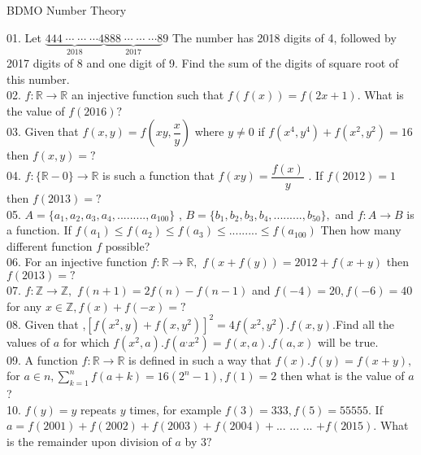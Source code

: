 \documentclass[a4paper,11pt]{article}
\begin{document}
\begin{center}
\begin{LARGE}
BDMO Number Theory\\
\end{LARGE}
\end{center}

01. Let $\underbrace{444\;\cdots\; \cdots\; \cdots 4}_{2018}\underbrace{888\;\cdots\; \cdots\; \cdots 8}_{2017}9$ The number has 2018 digits of 4, followed by 2017 digits of 8 and one digit of 9. Find the sum of the digits of square root of this number.\\

02. $f:\mathbb{R}\rightarrow \mathbb{R}$ an injective function such that $f(f(x))=f(2x+1)$. What is the value of $f(2016)?$\\

03. Given that $f(x,y) = f(xy,\dfrac{x}{y} )$ where $y\neq 0$ if $f(x^4,y^4)+f(x^2,y^2)=16$ then $ f(x,y) = ?$\\

04. $f:\{\mathbb{R}-0\} \to \mathbb{R}$ is such a function that $f(xy)=\dfrac{f(x)}{y}$ . If $f(2012)=1$ then $f(2013)=?$\\

05. $A=\{a_{1},a_{2},a_{3},a_{4},... ... ... , a_{100}\}$ ,  $B=\{b_{1},b_{2},b_{3},b_{4},... ... ... , b_{50}\},$ and $f:A \to B$ is a function. If $f(a_{1}) \le f(a_{2}) \le f(a_{3}) \le ... ... ... \le f(a_{100}) $ Then how many different function $f$ possible?\\

06. For an injective function $f:\mathbb{R} \to \mathbb{R},$  $f(x+f(y)) = 2012+ f(x+y)$ then $f(2013) = ?$\\

07. $f:\mathbb{Z} \to \mathbb{Z},$  $f(n+1) = 2f(n) - f(n-1)$ and $f(-4) = 20, f(-6) = 40$ for any $x \in \mathbb{Z}, f(x) + f(-x) = ?$\\

08. Given that ,$ [f(x^2,y)+f(x,y^2)]^2 = 4f(x^2,y^2).f(x,y) .$Find all the values of $a $ for which $f(x^2,a).f(a^,x^2) = f(x,a).f(a,x) $ will be true.\\

09. A function $f: \mathbb{R} \to \mathbb{R}$ is defined in such a way that $f(x).f(y)=f(x+y),$ for $a \in n , \sum\limits_{k=1}^{n} f(a+k) = 16(2^n -1), f(1)=2$ then what is the value of $a$?\\

10. $f(y)= y$ repeats $y$ times, for example $f(3) = 333, f(5) = 55555.$ If $ a = f(2001)+ f(2002)+f(2003) + f(2004)+ ...$ $...$ $...$ $+ f(2015).$ What is the remainder upon division of $a$ by $3?$\\
\end{document}
